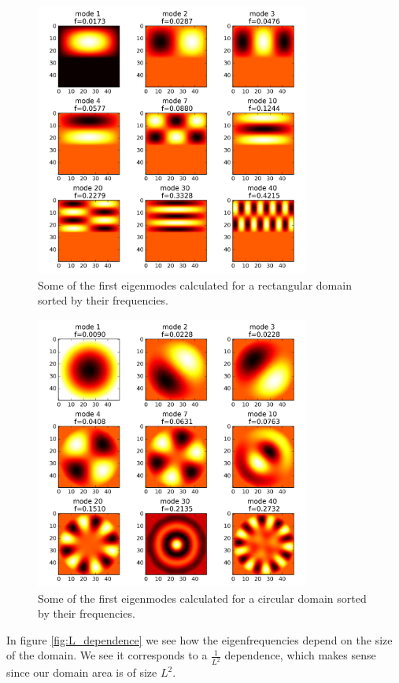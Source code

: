 \documentclass[a4paper]{article}
\begin{document}
\begin{figure}
\centering
\includegraphics[width=9cm]{Pictures/eigenmodes_r.png}
\caption{Some of the first eigenmodes calculated for a rectangular domain sorted by their frequencies.}
\label{fig:eigenmodes_r}
\end{figure}

\begin{figure}
\centering
\includegraphics[width=9cm]{Pictures/eigenmodes_c.png}
\caption{Some of the first eigenmodes calculated for a circular domain sorted by their frequencies.}
\label{fig:eigenmodes_c}
\end{figure}

In figure \ref{fig:L_dependence} we see how the eigenfrequencies depend on the size of the domain. We see it corresponds to a $\frac{1}{L^2}$ dependence, which makes sense since our domain area is of size $L^2$.
\end{document}
